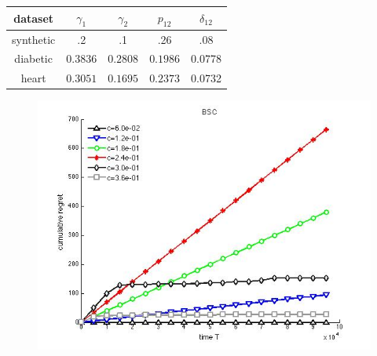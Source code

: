 \centering
\begin{tabular}[c]{c|c|c|c|c } 
	\label{tab:ErrorTable}
	
	dataset & $\gamma_1$ & $\gamma_2$ & $p_{12}$ & $\delta_{12}$\\ \hline 
	synthetic & .2 & .1 & .26 & .08\\  \hline
	diabetic & $0.3836 $ & $0.2808$ & $0.1986$ & 0.0778\\  \hline
	heart & $0.3051$ & $0.1695$ & $0.2373$ & 0.0732\\  \hline
\end{tabular}

\begin{figure}[!h]
	\centering
	\includegraphics[scale=.4]{../Simulations/Synthetic/BSC.jpg}
\end{figure}
